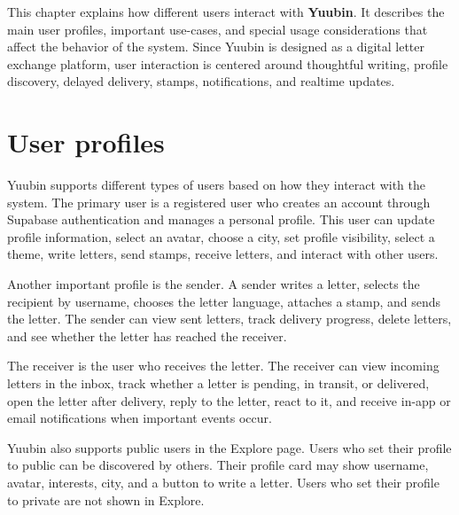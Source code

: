 ﻿\documentclass[12pt,a4paper]{report}
\begin{document}
This chapter explains how different users interact with \textbf{Yuubin}. It describes the main user profiles, important use-cases, and special usage considerations that affect the behavior of the system. Since Yuubin is designed as a digital letter exchange platform, user interaction is centered around thoughtful writing, profile discovery, delayed delivery, stamps, notifications, and realtime updates.

\section{User profiles}

Yuubin supports different types of users based on how they interact with the system. The primary user is a registered user who creates an account through Supabase authentication and manages a personal profile. This user can update profile information, select an avatar, choose a city, set profile visibility, select a theme, write letters, send stamps, receive letters, and interact with other users.

Another important profile is the sender. A sender writes a letter, selects the recipient by username, chooses the letter language, attaches a stamp, and sends the letter. The sender can view sent letters, track delivery progress, delete letters, and see whether the letter has reached the receiver.

The receiver is the user who receives the letter. The receiver can view incoming letters in the inbox, track whether a letter is pending, in transit, or delivered, open the letter after delivery, reply to the letter, react to it, and receive in-app or email notifications when important events occur.

Yuubin also supports public users in the Explore page. Users who set their profile to public can be discovered by others. Their profile card may show username, avatar, interests, city, and a button to write a letter. Users who set their profile to private are not shown in Explore.
\end{document}
